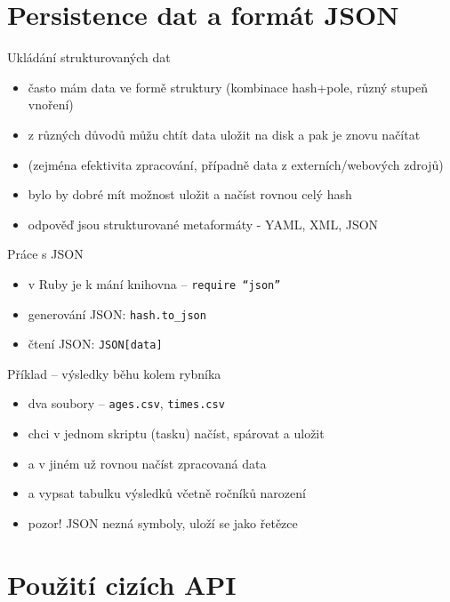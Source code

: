 \documentclass{beamer}
\begin{document}
\section{Persistence dat a formát JSON}

\begin{frame}{Ukládání strukturovaných dat}
  \begin{itemize}
    \item často mám data ve formě struktury (kombinace hash+pole, různý stupeň vnoření)
    \item z různých důvodů můžu chtít data uložit na disk a pak je znovu načítat
    \item (zejména efektivita zpracování, případně data z externích/webových zdrojů)
    \item bylo by dobré mít možnost uložit a načíst rovnou celý hash
    \item odpověď jsou strukturované metaformáty - YAML, XML, JSON
  \end{itemize}
\end{frame}

\begin{frame}{Práce s JSON}
  \begin{itemize}
    \item v Ruby je k mání knihovna -- \texttt{require ``json''}
    \item generování JSON: \texttt{hash.to\_json}
    \item čtení JSON: \texttt{JSON[data]}
  \end{itemize}
\end{frame}

\begin{frame}{Příklad -- výsledky běhu kolem rybníka}
  \begin{itemize}
    \item dva soubory -- \texttt{ages.csv}, \texttt{times.csv}
    \item chci v jednom skriptu (tasku) načíst, spárovat a uložit
    \item a v jiném už rovnou načíst zpracovaná data
    \item a vypsat tabulku výsledků včetně ročníků narození
    \item pozor! JSON nezná symboly, uloží se jako řetězce
  \end{itemize}
\end{frame}

\section{Použití cizích API}
\end{document}
